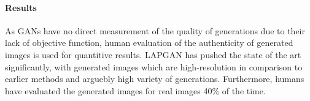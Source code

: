 \paragraph{Results}
As GANs have no direct measurement of the quality of generations due to their lack of objective function, human evaluation of the authenticity of generated images is used for quantitive results.
LAPGAN has pushed the state of the art significantly, with generated images which are high-resolution in comparison to earlier methods and arguebly high variety of generations.
Furthermore, humans have evaluated the generated images for real images 40\% of the time.


